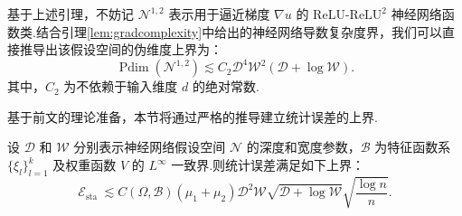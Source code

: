 基于上述引理，不妨记 $\mathcal{N}^{1,2}$ 表示用于逼近梯度 $\nabla u$ 的 $\mathrm{ReLU}$-$\mathrm{ReLU}^{2}$ 神经网络函数类.结合引理\ref{lem:gradcomplexity}中给出的神经网络导数复杂度界，我们可以直接推导出该假设空间的伪维度上界为：
\begin{equation*}
\operatorname{Pdim}(\mathcal{N}^{1,2})\lesssim C_2 \mathcal{D}^4\mathcal{W}^2(\mathcal{D}+\log\mathcal{W}).
\end{equation*}
其中，$C_2$ 为不依赖于输入维度 $d$ 的绝对常数.

基于前文的理论准备，本节将通过严格的推导建立统计误差的上界.
\begin{theorem}\label{thm:staerr:finalthm}
设 $\mathcal{D}$ 和 $\mathcal{W}$ 分别表示神经网络假设空间 $\mathcal{N}$ 的深度和宽度参数，$\mathcal{B}$ 为特征函数系 $\{\xi_{l}\}_{l=1}^{k}$ 及权重函数 $V$ 的 $L^{\infty}$ 一致界.则统计误差满足如下上界：
\begin{equation*}
\mathcal{E}_{\text {sta }}\lesssim C(\Omega,\mathcal{B})(\mu_{1}+\mu_{2})\mathcal{D}^{2}\mathcal{W}\sqrt{\mathcal{D}+\log\mathcal{W}}\sqrt{\frac{\log n}{n}}.
\end{equation*}
\end{theorem}

